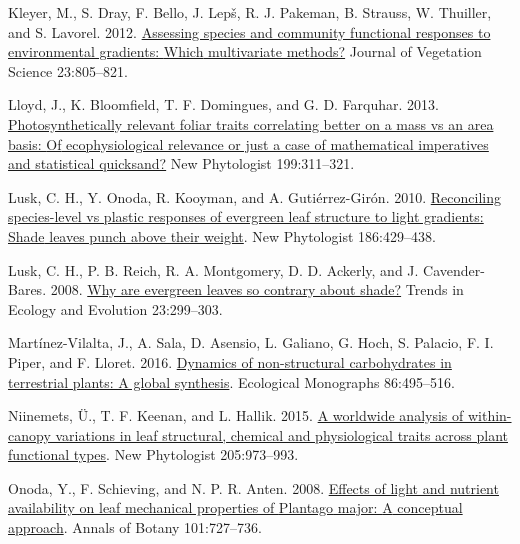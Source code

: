 \documentclass[
  12pt,
]{article}
\newlength{\cslhangindent} %
\newlength{\cslentryspacingunit} %
\newenvironment{CSLReferences}[2] %
 {%
  \setlength{\parindent}{0pt} %
  \ifodd #1 %
  \let\oldpar\par %
  \def\par{\hangindent=\cslhangindent\oldpar} %
  \fi %
  \setlength{\parskip}{#2\cslentryspacingunit} %
 }%
 {} %
\begin{document}
\begin{CSLReferences}{1}{0}
\leavevmode{}%
Kleyer, M., S. Dray, F. Bello, J. Lepš, R. J. Pakeman, B. Strauss, W. Thuiller, and S. Lavorel. 2012. \href{https://doi.org/10.1111/j.1654-1103.2012.01402.x}{Assessing species and community functional responses to environmental gradients: {Which} multivariate methods?} Journal of Vegetation Science 23:805--821.

\leavevmode{}%
Lloyd, J., K. Bloomfield, T. F. Domingues, and G. D. Farquhar. 2013. \href{https://doi.org/10.1111/nph.12281}{Photosynthetically relevant foliar traits correlating better on a mass vs an area basis: {Of} ecophysiological relevance or just a case of mathematical imperatives and statistical quicksand?} New Phytologist 199:311--321.

\leavevmode{}%
Lusk, C. H., Y. Onoda, R. Kooyman, and A. Gutiérrez-Girón. 2010. \href{https://doi.org/10.1111/j.1469-8137.2010.03202.x}{Reconciling species-level vs plastic responses of evergreen leaf structure to light gradients: {Shade} leaves punch above their weight}. New Phytologist 186:429--438.

\leavevmode{}%
Lusk, C. H., P. B. Reich, R. A. Montgomery, D. D. Ackerly, and J. Cavender-Bares. 2008. \href{https://doi.org/10.1016/j.tree.2008.02.006}{Why are evergreen leaves so contrary about shade?} Trends in Ecology and Evolution 23:299--303.

\leavevmode{}%
Martínez-Vilalta, J., A. Sala, D. Asensio, L. Galiano, G. Hoch, S. Palacio, F. I. Piper, and F. Lloret. 2016. \href{https://doi.org/10.1002/ecm.1231}{Dynamics of non-structural carbohydrates in terrestrial plants: A global synthesis}. Ecological Monographs 86:495--516.

\leavevmode{}%
Niinemets, Ü., T. F. Keenan, and L. Hallik. 2015. \href{https://doi.org/10.1111/nph.13096}{A worldwide analysis of within-canopy variations in leaf structural, chemical and physiological traits across plant functional types}. New Phytologist 205:973--993.

\leavevmode{}%
Onoda, Y., F. Schieving, and N. P. R. Anten. 2008. \href{https://doi.org/10.1093/aob/mcn013}{Effects of light and nutrient availability on leaf mechanical properties of {Plantago} major: {A} conceptual approach}. Annals of Botany 101:727--736.


\end{CSLReferences}
\end{document}

